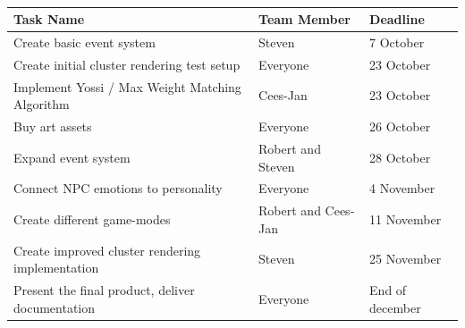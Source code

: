 \documentclass[11pt]{article} %
\begin{document}
~\\
\begin{tabular}{|  l | l | l | }
  \hline			
  Task Name & Team Member & Deadline  \\ \hline
  Create basic event system & Steven & 7 October \\ \hline 
  Create initial cluster rendering test setup & Everyone & 23 October \\ \hline 
  Implement Yossi / Max Weight Matching Algorithm & Cees-Jan & 23 October \\ \hline
  Buy  art assets & Everyone & 26 October \\ \hline 
  Expand event system & Robert and Steven & 28 October \\ \hline  
  Connect NPC emotions to personality & Everyone & 4 November \\ \hline
  Create different game-modes & Robert and Cees-Jan & 11 November \\ \hline
  Create improved cluster rendering implementation & Steven & 25 November \\ \hline  
  Present the final product, deliver documentation & Everyone & End of december \\ \hline
\end{tabular}
\end{document}
